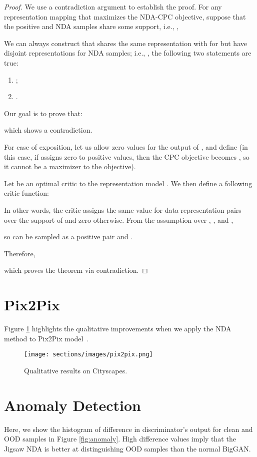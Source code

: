 \documentclass{article} \usepackage{iclr2021_conference,times}
\begin{document}
\begin{proof}
We use a contradiction argument to establish the proof.
For any representation mapping that maximizes the NDA-CPC objective, 
 suppose that the positive and NDA samples share some support, i.e., ,
 
We can always construct  that shares the same representation with  for  but have disjoint representations for NDA samples; i.e., , the following two statements are true:
\begin{enumerate}
    \item ;
    \item .
\end{enumerate}
Our goal is to prove that:

which shows a contradiction. 

For ease of exposition, let us allow zero values for the output of , and define  (in this case, if  assigns zero to positive values, then the CPC objective becomes , so it cannot be a maximizer to the objective).

Let  be an optimal critic to the representation model 
. We then define a following critic function:

In other words, the critic assigns the same value for data-representation pairs over the support of  and zero otherwise.
From the assumption over , , and ,

so 
can be sampled as a positive pair and .

Therefore, 

which proves the theorem via contradiction.
\end{proof}





\section{Pix2Pix}
\label{sec:pix2pix}
Figure \ref{fig:pix2pix_nda} highlights the qualitative improvements when we apply the NDA method to  Pix2Pix model~\citep{isola2017image}.

\begin{figure}[!htb]
    \centering
    \texttt{[image: sections/images/pix2pix.png]}
    \caption{Qualitative results on Cityscapes.}
    \label{fig:pix2pix_nda}
\end{figure}

\section{Anomaly Detection}
Here, we show the histogram of difference in discriminator’s output for clean and OOD samples in Figure \ref{fig:anomaly}. High difference values imply that the Jigsaw NDA is better at distinguishing OOD samples than the normal BigGAN.
\end{document}

